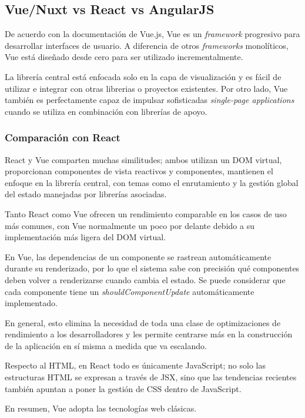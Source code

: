 \subsection{Vue/Nuxt vs React vs AngularJS}
De acuerdo con la documentación de Vue.js\cite{noauthor_que_nodate}, Vue es un \textit{framework} progresivo para desarrollar interfaces de usuario. A diferencia de otros \textit{frameworks} monolíticos, Vue está diseñado desde cero para ser utilizado incrementalmente.


La librería central está enfocada solo en la capa de visualización y es fácil de utilizar e integrar con otras librerias o proyectos existentes. Por otro lado, Vue también es perfectamente capaz de impulsar sofisticadas \textit{single-page applications} cuando se utiliza en combinación con librerías de apoyo.


\subsubsection*{Comparación con React}

React y Vue comparten muchas similitudes; ambos utilizan un DOM virtual, proporcionan componentes de vista reactivos y componentes, mantienen el enfoque en la librería central, con temas como el enrutamiento y la gestión global del estado manejadas por librerías asociadas.


Tanto React como Vue ofrecen un rendimiento comparable en los casos de uso más comunes, con Vue normalmente un poco por delante debido a su implementación más ligera del DOM virtual.


En Vue, las dependencias de un componente se rastrean automáticamente durante su renderizado, por lo que el sistema sabe con precisión qué componentes deben volver a renderizarse cuando cambia el estado. Se puede considerar que cada componente tiene un \textit{shouldComponentUpdate} automáticamente implementado.


En general, esto elimina la necesidad de toda una clase de optimizaciones de rendimiento a los desarrolladores y les permite centrarse más en la construcción de la aplicación en sí misma a medida que va escalando.


Respecto al HTML, en React todo es únicamente JavaScript; no solo las estructuras HTML se expresan a través de JSX, sino que las tendencias recientes también apuntan a poner la gestión de CSS dentro de JavaScript.


En resumen, Vue adopta las tecnologías web clásicas.


